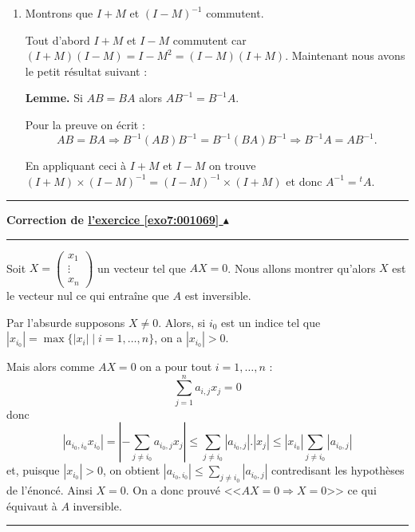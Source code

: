 \documentclass[11pt,a4paper]{article}
\newcounter{exo}
\newcommand{\correction}[1]{\hypertarget{cor7:#1}{}\label{cor7:#1}{\bf Correction de \hyperlink{exo7:#1}{l'exercice \ref{exo7:#1} $\blacktriangle$}}\vspace{1mm}\hrule\vspace{1mm}}
\newcommand{\fincorrection}{\vspace{1mm}\hrule\vspace*{7mm}}
\begin{document}
\begin{enumerate}
\begin{enumerate}
      \item Montrons que $I+M$ et $(I-M) ^{-1}$ commutent.

Tout d'abord $I+M$ et $I-M$ commutent car $(I+M)(I-M) = I-M^2 = (I-M)(I+M)$.
Maintenant nous avons le petit résultat suivant :

\textbf{Lemme.} Si $AB=BA$ alors $AB^{-1}=B^{-1}A$.

Pour la preuve on écrit :
$$AB=BA \Rightarrow B^{-1}(AB)B^{-1}=B^{-1}(BA)B^{-1} \Rightarrow B^{-1}A=AB^{-1}.$$

En appliquant ceci à $I+M$ et $I-M$ on trouve $(I+M)\times (I-M) ^{-1}= (I-M) ^{-1}\times(I+M)$
et donc $A^{-1}={}^t\!A$.

    \end{enumerate}
\end{enumerate}

\fincorrection
\correction{001069}
Soit $X=\left(
\begin{array}{c}
x_1\\
\vdots\\
x_n
\end{array}
\right)$  un vecteur tel que $AX=0$. 
Nous allons montrer qu'alors $X$ est le vecteur nul ce qui entraîne que $A$ est inversible.

Par l'absurde supposons $X\neq0$. 
Alors, si $i_0$ est un indice tel que $|x_{i_0}|=\max\big\{|x_i| \mid i=1,\ldots,n\big\}$, on a  $|x_{i_0}|>0$.

Mais alors comme $AX=0$ on a pour tout $i=1,\ldots,n$ :
$$\sum_{j=1}^{n}a_{i,j}x_j=0$$
donc 
$$|a_{i_0,i_0}x_{i_0}|=\left|-\sum_{j\neq i_0}^{}a_{i_0,j}x_j\right|\leq\sum_{j\neq i_0}^{}|a_{i_0,j}|.|x_j|
 \leq|x_{i_0}|\sum_{j\neq i_0}^{}|a_{i_0,j}|
$$
et, puisque $|x_{i_0}|> 0$, on obtient $|a_{i_0,i_0}|\leq\sum_{j\neq i_0}^{}|a_{i_0,j}|$ contredisant les hypothèses de l'énoncé. 
Ainsi $X=0$. On a donc prouvé <<$AX=0 \Rightarrow X=0$>> ce qui équivaut à $A$ inversible.
\fincorrection
\end{document}
